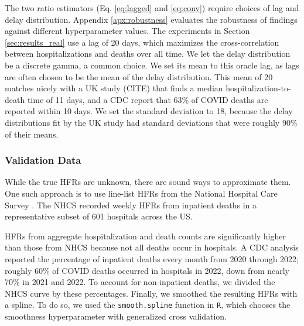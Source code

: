 \documentclass{article}
\newcommand{\ahcomment}[1]{{\color{teal}[AH: #1]}}
\begin{document}
The two ratio estimators (Eq. \ref{eq:lagged} and \ref{eq:conv}) require choices of lag and delay distribution. Appendix \ref{apx:robustness} evaluates the robustness of findings against different hyperparameter values. The experiments in Section \ref{sec:results_real} use a lag of 20 days, which maximizes the cross-correlation between hospitalizations and deaths over all time. We let the delay distribution be a discrete gamma, a common choice. We set its mean to this oracle lag, as lags are often chosen to be the mean of the delay distribution. This mean of 20 matches nicely with a UK study (CITE) that finds a median hospitalization-to-death time of 11 days, and a CDC report that 63\% of COVID deaths are reported within 10 days. We set the standard deviation to 18, because the delay distributions fit by the UK study had standard deviations that were roughly 90\% of their means. 



\subsubsection{Validation Data}
While the true HFRs are unknown, there are sound ways to approximate them. One such approach is to use line-list HFRs from the National Hospital Care Survey \cite{NHCS2023}. The NHCS recorded weekly HFRs from inpatient deaths in a representative subset of 601 hospitals across the US. %

HFRs from aggregate hospitalization and death counts are significantly higher than those from NHCS because not all deaths occur in hospitals. A CDC analysis reported the percentage of inpatient deaths every month from 2020 through 2022; roughly 60\% of COVID deaths occurred in hospitals in 2022, down from nearly 70\% in 2021 and 2022. To account for non-inpatient deaths, we divided the NHCS curve by these percentages. Finally, we smoothed the resulting HFRs with a spline. To do so, we used the \texttt{smooth.spline} function in \texttt{R}, which chooses the smoothness hyperparameter with generalized cross validation. %
\end{document}
